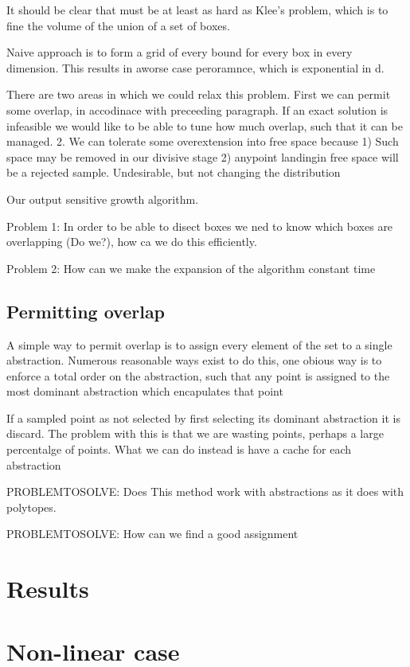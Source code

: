 It should be clear that must be at least as hard as Klee's problem, which is to fine the volume of the union of a set of boxes.

Naive approach is to form a grid of every bound for every box in every dimension.  This results in aworse case peroramnce, which is exponential in d.

There are two areas in which we could relax this problem.  First we can permit some overlap, in accodinace with preceeding paragraph.  If an exact solution is infeasible we would like to be able to tune how much overlap, such that it can be managed.  2. We can tolerate some overextension into free space because 1) Such space may be removed in our divisive stage 2) anypoint landingin free space will be a rejected sample.  Undesirable, but not changing the distribution

Our output sensitive growth algorithm.

Problem 1: In order to be able to disect boxes we ned to know which boxes are overlapping (Do we?), how ca we do this efficiently.

Problem 2: How can we make the expansion of the algorithm constant time

\subsection{Permitting overlap}
A simple way to permit overlap is to assign every element of the set to a single abstraction.
Numerous reasonable ways exist to do this, one obious way is to enforce a total order on the abstraction, such that any point is assigned to the most dominant abstraction which encapulates that point

If a sampled point as not selected by first selecting its dominant abstraction it is discard.
The problem with this is that we are wasting points, perhaps a large percentalge of points.
What we can do instead is have a cache for each abstraction

PROBLEMTOSOLVE: Does This method work with abstractions as it does with polytopes.

PROBLEMTOSOLVE: How can we find a good assignment

\section{Results}

\section{Non-linear case}

